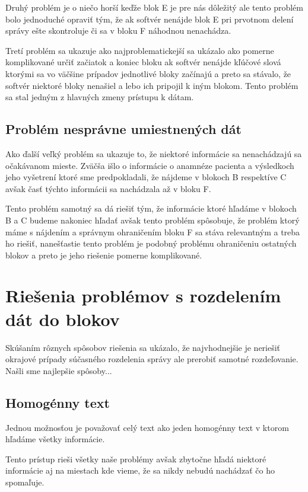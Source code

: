 Druhý problém je o niečo horší keďže blok E je pre nás dôležitý ale tento problém bolo jednoduché opraviť tým, že ak softvér nenájde blok E pri prvotnom delení správy ešte skontroluje či sa v bloku F náhodnou nenachádza.

Tretí problém sa ukazuje ako najproblematickejší sa ukázalo ako pomerne komplikované určiť začiatok a koniec bloku ak softvér nenájde kľúčové slová ktorými sa vo väčšine prípadov jednotlivé bloky začínajú a preto sa stávalo, že softvér niektoré bloky nenašiel a lebo ich pripojil k iným blokom. Tento problém sa stal jedným z hlavných zmeny prístupu k dátam.

\subsection{Problém nesprávne umiestnených dát}

Ako ďalší veľký problém sa ukazuje to, že niektoré informácie sa nenachádzajú sa očakávanom mieste. Zväčša išlo o informácie o anamnéze pacienta a výsledkoch jeho vyšetrení ktoré sme predpokladali, že nájdeme v blokoch B respektíve C avšak časť týchto informácii sa nachádzala až v bloku F.

Tento problém samotný sa dá riešiť tým, že informácie ktoré hľadáme v blokoch B a C budeme nakoniec hľadať avšak tento problém spôsobuje, že problém ktorý máme s nájdením a správnym ohraničením bloku F sa stáva relevantným a treba ho riešiť, nanešťastie tento problém je podobný problému ohraničeniu ostatných blokov a preto je jeho riešenie pomerne komplikované.

\section{Riešenia problémov s rozdelením dát do blokov}

Skúšaním rôznych spôsobov riešenia sa ukázalo, že najvhodnejšie je neriešiť okrajové prípady súčasného rozdelenia správy ale prerobiť samotné rozdeľovanie. {Našli sme najlepšie spôsoby...}

\subsection{Homogénny text}

Jednou možnosťou je považovať celý text ako jeden homogénny text v ktorom hľadáme všetky informácie.

Tento prístup rieši všetky naše problémy avšak zbytočne hľadá niektoré informácie aj na miestach kde vieme, že sa nikdy nebudú nachádzať čo ho spomaľuje.

